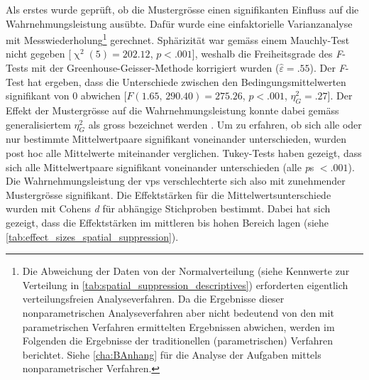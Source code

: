 \documentclass[11pt, twoside, a4paper]{book}		%
\begin{document}
Als erstes wurde geprüft, ob die Mustergrösse einen signifikanten Einfluss auf die Wahrnehmungsleistung ausübte.
Dafür wurde eine einfaktorielle Varianzanalyse mit Messwiederholung\footnote{Die Abweichung der Daten von der Normalverteilung (siehe Kennwerte zur Verteilung in \autoref{tab:spatial_suppression_descriptives}) erforderten eigentlich verteilungsfreien Analyseverfahren. Da die Ergebnisse dieser nonparametrischen Analyseverfahren aber nicht bedeutend von den mit parametrischen Verfahren ermittelten Ergebnissen abwichen, werden im Folgenden die Ergebnisse der traditionellen (parametrischen) Verfahren berichtet. Siehe \autoref{cha:BAnhang} für die Analyse der Aufgaben mittels nonparametrischer Verfahren.}
gerechnet. Sphärizität war gemäss einem Mauchly-Test nicht gegeben [$\upchi^2(5)=202.12$, $p<.001$], weshalb die Freiheitsgrade des \textit{F}-Tests mit der Greenhouse-Geisser-Methode korrigiert wurden ($\hat{\varepsilon}=.55$). Der \textit{F}-Test hat ergeben, dass die Unterschiede zwischen den Bedingungsmittelwerten signifikant von 0 abwichen [$F(1.65,\,290.40)=275.26$, $p<.001$, $\eta_{G}^2=.27$]. Der Effekt der Mustergrösse auf die Wahrnehmungsleistung konnte dabei gemäss generalisiertem $\eta_{G}^2$ \citep{Olejnik2003} als gross bezeichnet werden \citep{Bakeman2005}.
Um zu erfahren, ob sich alle oder nur bestimmte Mittelwertpaare signifikant voneinander unterschieden, wurden post hoc alle Mittelwerte miteinander verglichen.
Tukey-Tests haben gezeigt, dass sich alle Mittelwertpaare signifikant voneinander unterschieden (alle \textit{p}s $<.001$).
Die Wahrnehmungsleistung der \glspl{vp} verschlechterte sich also mit zunehmender Mustergrösse signifikant.
Die Effektstärken für die Mittelwertsunterschiede wurden mit Cohens \textit{d} für abhängige Stichproben \citep{Morris2002} bestimmt. 
Dabei hat sich gezeigt, dass die Effektstärken im mittleren bis hohen Bereich \citep[][S. 40]{Cohen1988} lagen (siehe \autoref{tab:effect_sizes_spatial_suppression}). 
\end{document}
